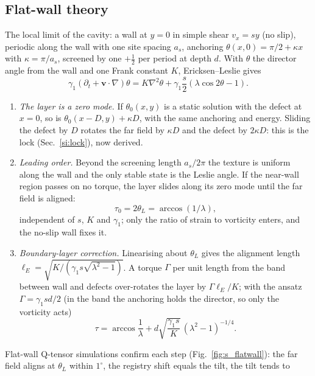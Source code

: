 \documentclass[aps,prl,onecolumn,superscriptaddress,amsmath,amssymb,nofootinbib]{revtex4-2}
\newcommand{\half}{\tfrac12}
\begin{document}
\subsection{Flat-wall theory}
The local limit of the cavity: a wall at $y=0$ in simple shear $v_x=sy$ (no slip), periodic along the wall with one site spacing $a_s$, anchoring $\theta(x,0)=\pi/2+\kappa x$
with $\kappa=\pi/a_s$, screened by one $+\half$ per period at depth $d$. With $\theta$ the director angle from the wall and one Frank constant $K$, Ericksen--Leslie gives
\begin{equation}
\gamma_1(\partial_t+\mathbf v\cdot\nabla)\theta=K\nabla^2\theta+\gamma_1\frac s2(\lambda\cos2\theta-1).
\end{equation}
\begin{enumerate}
\item \emph{The layer is a zero mode.} If $\theta_0(x,y)$ is a static solution with the defect at $x=0$, so is $\theta_0(x-D,y)+\kappa D$, with the same anchoring and energy.
Sliding the defect by $D$ rotates the far field by $\kappa D$ and the defect by $2\kappa D$: this is the lock (Sec.~\ref{si:lock}), now derived.
\item \emph{Leading order.} Beyond the screening length $a_s/2\pi$ the texture is uniform along the wall and the only stable state is the Leslie angle. If the near-wall region passes
on no torque, the layer slides along its zero mode until the far field is aligned:
\begin{equation}\tau_0=2\theta_L=\arccos(1/\lambda),\end{equation}
independent of $s$, $K$ and $\gamma_1$; only the ratio of strain to vorticity enters, and the no-slip wall fixes it.
\item \emph{Boundary-layer correction.} Linearising about $\theta_L$ gives the alignment length $\ell_E=\sqrt{K/(\gamma_1s\sqrt{\lambda^2-1})}$. A torque $\Gamma$ per unit length from
the band between wall and defects over-rotates the layer by $\Gamma\ell_E/K$; with the ansatz $\Gamma=\gamma_1sd/2$ (in the band the anchoring holds the director, so only the
vorticity acts)
\begin{equation}
\tau=\arccos\frac1\lambda+d\sqrt{\frac{\gamma_1s}K}\,(\lambda^2-1)^{-1/4}.\label{eq:s_tiltcorr}
\end{equation}
\end{enumerate}
Flat-wall Q-tensor simulations confirm each step (Fig.~\ref{fig:s_flatwall}): the far field aligns at $\theta_L$ within $1^\circ$, the registry shift equals the tilt, the tilt tends to
\end{document}

